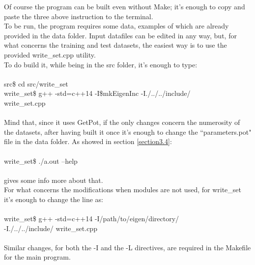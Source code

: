 \documentclass[12pt, a4paper]{report}
\theoremstyle{definition}
\begin{document}
Of course the program can be built even without Make; it's enough to copy and paste the three above instruction to the terminal.\\
\newline\noindent To be run, the program requires some data, examples of which are already provided in the data folder. Input datafiles can be edited in any way, but, for what concerns the training and test datasets, the easiest way is to use the provided {\ttfamily write\_set.cpp} utility.\\
To do build it, while being in the src folder, it's enough to type:\\
{\\ \ttfamily 
	src\$ cd src/write\_set\\
	write\_set\$ g++ -std=c++14 -I\$mkEigenInc -I./../../include/\\ write\_set.cpp\\
\\}
Mind that, since it uses GetPot, if the only changes concern the numerosity of the datasets, after having built it once it's enough to change the ``parameters.pot" file in the data folder. As showed in section \ref{section3.4}: \\
{\\ \ttfamily 
	write\_set\$ ./a.out --help\\
\\}
gives some info more about that.\\
\newline\noindent For what concerns the modifications when modules are not used, for write\_set it's enough to change the line as:\\
{\\ \ttfamily 
	write\_set\$ g++ -std=c++14 -I/path/to/eigen/directory/\\ -I./../../include/ write\_set.cpp\\
\\}
Similar changes, for both the {\ttfamily -I} and the {\ttfamily -L} directives, are required in the Makefile for the main program.
\newpage
\end{document}
